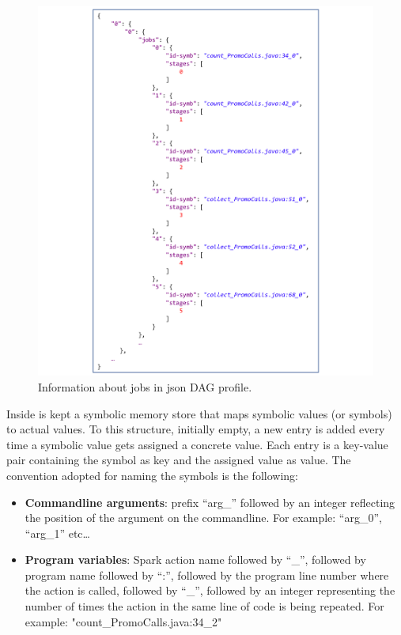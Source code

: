\begin{figure}[tbhp]
	\hspace*{-1.7cm}
	\centering
	\includegraphics[width=15cm]{images/xsparksymb_profile_jobs_info}
	\caption{Information about jobs in json DAG profile.}
	\label{fig:profile_jobs_info}
\end{figure}
Inside \tool is kept a symbolic memory store that maps symbolic values (or symbols) to actual values. To this structure, initially empty, a new entry is added every time a symbolic value gets assigned a concrete value. Each entry is a key-value pair containing the symbol as key and the assigned value as value. The convention adopted for naming the symbols is the following:
\begin{itemize}
	\item \textbf{Commandline arguments}: prefix “arg\_” followed by an integer reflecting the position of the argument on the commandline. For example: “arg\_0”, “arg\_1” etc…
	\item \textbf{Program variables}: Spark action name followed by “\_”, followed by program name followed by “:”, followed by the program line number where the action is called, followed by “\_”, followed by an integer representing the number of times the action in the same line of code is being repeated. For example: "count\_PromoCalls.java:34\_2"
\end{itemize} 
